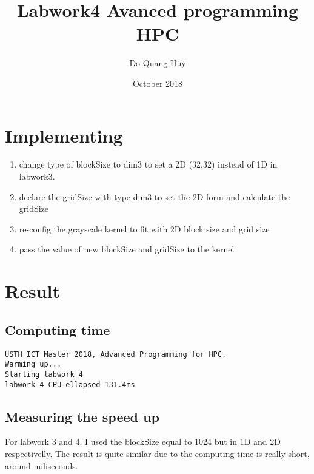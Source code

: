 \documentclass{article}
\title{Labwork4 Avanced programming HPC}
\author{Do Quang Huy}
\date{October 2018}
\begin{document}
\maketitle

\section{Implementing}
\begin{enumerate}
    \item change type of blockSize to dim3 to set a 2D (32,32) instead of 1D in labwork3.
    \item declare the gridSize with type dim3 to set the 2D form and calculate the gridSize
    \item re-config the grayscale kernel to fit with 2D block size and grid size
    \item pass the value of new blockSize and gridSize to the kernel
    
\end{enumerate}
\section{Result}
\subsection{Computing time}
\begin{verbatim}
USTH ICT Master 2018, Advanced Programming for HPC.
Warming up...
Starting labwork 4
labwork 4 CPU ellapsed 131.4ms
\end{verbatim}
\subsection{Measuring the speed up}
For labwork 3 and 4, I used the blockSize equal to 1024 but in 1D and 2D respectivelly. The result is quite similar due to the computing time is really short, around miliseconds.
\end{document}

